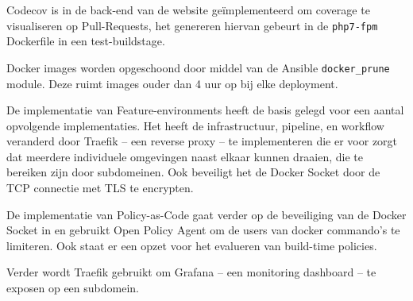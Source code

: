 Codecov is in de back-end van de website geïmplementeerd om coverage te visualiseren op Pull-Requests, het genereren hiervan gebeurt in de \texttt{php7-fpm} Dockerfile in een test-buildstage.

Docker images worden opgeschoond door middel van de Ansible \texttt{docker\_prune} module. Deze ruimt images ouder dan 4 uur op bij elke deployment.

De implementatie van Feature-environments heeft de basis gelegd voor een aantal opvolgende implementaties. Het heeft de infrastructuur, pipeline, en workflow veranderd door Traefik -- een reverse proxy -- te implementeren die er voor zorgt dat meerdere individuele omgevingen naast elkaar kunnen draaien, die te bereiken zijn door subdomeinen. Ook beveiligt het de Docker Socket door de TCP connectie met TLS te encrypten. 

De implementatie van Policy-as-Code gaat verder op de beveiliging van de Docker Socket in en gebruikt Open Policy Agent om de users van docker commando's te limiteren. Ook staat er een opzet voor het evalueren van build-time policies.

Verder wordt Traefik gebruikt om Grafana -- een monitoring dashboard -- te exposen op een subdomein.
